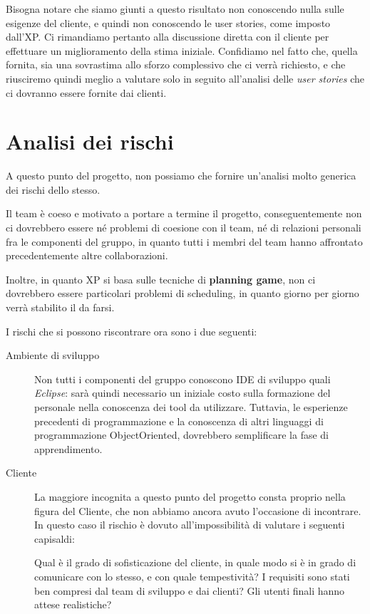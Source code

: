 Bisogna notare che siamo giunti a questo risultato non conoscendo nulla 
sulle esigenze del cliente, e quindi non conoscendo le user stories, come 
imposto dall'XP. Ci rimandiamo pertanto alla discussione diretta con il cliente
per effettuare un miglioramento della stima iniziale. Confidiamo nel fatto che,
quella fornita, sia una sovrastima allo sforzo complessivo che ci verrà richiesto,
e che riusciremo quindi meglio a valutare solo in seguito all'analisi delle 
\textit{user stories} che ci dovranno essere fornite dai clienti.

\section{Analisi dei rischi}\label{sec:adr}
A questo punto del progetto, non possiamo che fornire un'analisi molto generica
dei rischi dello stesso.

Il team è coeso e motivato a portare a termine il progetto, conseguentemente
non ci dovrebbero essere né problemi di coesione con il team, né di relazioni
personali fra le componenti del gruppo, in quanto tutti i membri del team hanno
affrontato precedentemente altre collaborazioni. 

Inoltre, in quanto XP si basa sulle tecniche di \textbf{planning game}, non ci dovrebbero
essere particolari problemi di scheduling, in quanto giorno per giorno verrà
stabilito il da farsi. 

I rischi che si possono riscontrare ora sono i due seguenti:
\begin{description}
\item[Ambiente di sviluppo] Non tutti i componenti del gruppo conoscono IDE di
	sviluppo quali \textit{Eclipse}: sarà quindi necessario un iniziale costo
	sulla formazione del personale nella conoscenza dei tool da utilizzare.
	Tuttavia, le esperienze precedenti di programmazione e la conoscenza
	di altri linguaggi di programmazione ObjectOriented, dovrebbero semplificare
	la fase di apprendimento.
\item[Cliente] La maggiore incognita a questo punto del progetto consta proprio
	nella figura del Cliente, che non abbiamo ancora avuto l'occasione di
	incontrare. In questo caso il rischio è dovuto all'impossibilità di
	valutare i seguenti capisaldi:
\begin{itemize}
\diam Qual è il grado di sofisticazione del cliente, in quale modo si è in
	grado di comunicare con lo stesso, e con quale tempestività?
\diam I requisiti sono stati ben compresi dal team di sviluppo e dai clienti?
\diam Gli utenti finali hanno attese realistiche?
\end{itemize}
\end{description}

